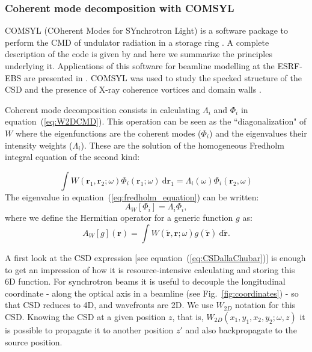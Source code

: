 \documentclass{iucr}
\newcommand{\inblue}[1]{{\color{blue}#1}}
\begin{document}
\subsubsection{Coherent mode decomposition with COMSYL\\}\label{sec:COMSYL} 
 COMSYL (COherent Modes for SYnchrotron Light) is a software package to perform the CMD of undulator radiation in a storage ring \cite{codeCOMSYL}. A complete description of the code is given by  and here we summarize the principles underlying it. Applications of this software for beamline modelling at the ESRF-EBS are presented in \cite{glass2017, hierarchical}. COMSYL was used to study the specked structure of the CSD and the presence of X-ray coherence vortices and domain walls \cite{PaganinSanchezDelRio2019}.

Coherent mode decomposition consists in calculating $\Lambda_i$ and $\Phi_i$ in equation~(\ref{eq:W2DCMD}). This operation can be seen as the ``diagonalization" of $W$ where the eigenfunctions are the coherent modes ($\Phi_i$) and the eigenvalues their intensity weights ($\Lambda_i$). These are the solution of the homogeneous Fredholm integral equation of the second kind:

\begin{equation}\label{eq:fredholm_equation}
\int W(\textbf{r}_1,\textbf{r}_2;\omega)
\Phi_i(\textbf{r}_1;\omega)~\text{d}\textbf{r}_1  = \Lambda_i(\omega) \Phi_i(\textbf{r}_2,\omega)
\end{equation}
The eigenvalue in equation~(\ref{eq:fredholm_equation}) can be written: 
\begin{equation}
A_{W}[\Phi_i] = \Lambda_i \Phi_i,
\end{equation}
where we define the Hermitian operator for a generic function $g$ as:
\begin{equation}\label{eq:Hermitian}
A_{W}[g](\textbf{r})  = \int W(\tilde{\textbf{r}},\textbf{r};\omega) g(\tilde{\textbf{r}})~ \text{d}\tilde{\textbf{r}}.
\end{equation}

A first look at the CSD expression [see equation~(\ref{eq:CSDallaChubar})] is enough to get an impression of how it is resource-intensive calculating and storing this 6D function. For synchrotron beams it is useful to decouple the longitudinal coordinate - along the optical axis in a beamline (see \inblue{Fig.~\ref{fig:coordinates}}) - so that CSD reduces to 4D, and wavefronts are 2D. We use $W_{2D}$ notation for this CSD. Knowing the CSD at a given position $z$, that is, $W_{2D}(x_1,y_1,x_2,y_2; \omega, z)$ it is possible to propagate it to another position $z'$ and also backpropagate to the source position.
\end{document}
